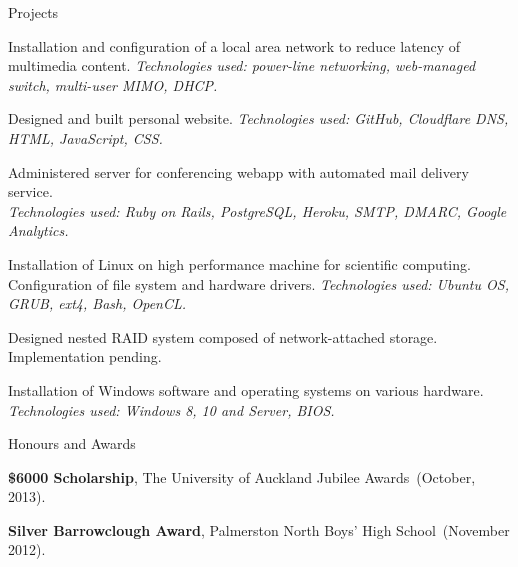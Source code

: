 \documentclass[11pt]{tracv}
\begin{document}
\begin{hangingsection}{Projects}
	
	\hangingentry Installation and configuration of a local area network to reduce latency of multimedia content. \textit{Technologies used: power-line networking, web-managed switch, multi-user MIMO, DHCP.}
	
	\hangingentry Designed and built personal website. \textit{Technologies used: GitHub, Cloudflare DNS, HTML, JavaScript, CSS.}
	
	\hangingentry Administered server for conferencing webapp with automated mail delivery service. \\ \textit{Technologies used: Ruby on Rails, PostgreSQL, Heroku, SMTP, DMARC, Google Analytics.}
	
	\hangingentry Installation of Linux on high performance machine for scientific computing. Configuration of file system and hardware drivers. \textit{Technologies used: Ubuntu OS, GRUB, ext4, Bash, OpenCL.}
	
	\hangingentry Designed nested RAID system composed of network-attached storage. Implementation pending.
	
	\hangingentry Installation of Windows software and operating systems on various hardware. \\ \textit{Technologies used: Windows 8, 10 and Server, BIOS.}
	
\end{hangingsection}

\begin{hangingsection}{Honours and Awards}

	\hangingentry \textbf{\$6000 Scholarship}, The University of Auckland Jubilee Awards~(October, 2013).

	\hangingentry \textbf{Silver Barrowclough Award}, Palmerston North Boys' High School~(November 2012).

%

\end{hangingsection}
\end{document}
